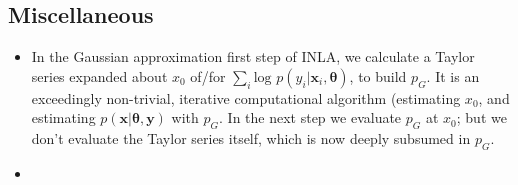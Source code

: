 \documentclass{article}
\begin{document}
\subsection*{Miscellaneous}
\begin{itemize}
\item In the Gaussian approximation first step of INLA, we calculate a Taylor series expanded about $x_{0}$ of/for $\sum_{i} \text{log }p(y_{i}|\pmb{x}_{i},\pmb{\theta})$, to build $p_{G}$. It is an exceedingly non-trivial, iterative computational algorithm (estimating $x_{0}$, and estimating $p(\pmb{x}|\pmb{\theta}, \pmb{y})$ with $p_{G}$. In the next step we evaluate $p_{G}$ at $x_{0}$; but we don't evaluate the Taylor series itself, which is now deeply subsumed in $p_{G}$.
\item
\end{itemize}
\end{document}
